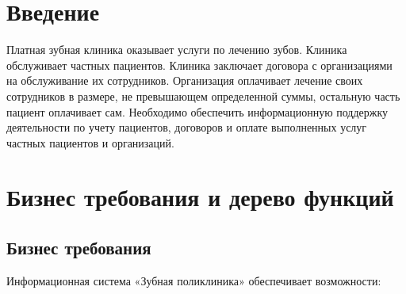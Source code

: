 \documentclass[a4paper,12pt]{article}
\begin{document}

\newpage

\tableofcontents





\newpage
\section*{Введение}

\par Платная зубная клиника оказывает услуги по лечению зубов. Клиника обслуживает частных пациентов. Клиника заключает договора с организациями на обслуживание их сотрудников. Организация оплачивает лечение своих сотрудников в размере, не превышающем определенной суммы, остальную часть пациент оплачивает сам. Необходимо обеспечить информационную поддержку деятельности по учету пациентов, договоров и оплате выполненных услуг частных пациентов и организаций.


\newpage
\section{Бизнес требования и дерево функций}
\subsection{Бизнес требования}
Информационная система «Зубная поликлиника» обеспечивает возможности:
\end{document}
